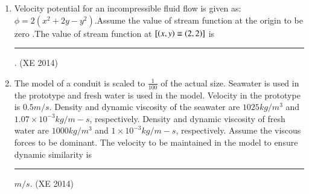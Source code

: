 \documentclass[journal,12pt,onecolumn]{IEEEtran}
\theoremstyle{remark}
\begin{document}
\begin{enumerate}
\hfill{(XE 2014)}
\begin{multicols}{4}
\begin{enumerate}

\item $\frac{k_1 + k_2}{r}$
\item $\frac{\sqrt{{k_1}^2 + {k_2}^2}}{r}$
\item a constant
\item proportional to $r^{-3}$ .

\end{enumerate}
\end{multicols}

\item Velocity potential for an incompressible fluid flow is given as: $ \phi = 2(x^2 + 2y - y^2)$.Assume the 
value of stream function at the origin to be zero .The value of stream function at $[\left(x,y\right) \equiv \left(2,2\right)]$ is \rule{2cm}{0.4pt} .
\hfill{(XE 2014)}

\item The model of a conduit is scaled to $\frac{1}{100}$ of the actual size. Seawater is used in the prototype and fresh water is used in the model. Velocity in the prototype is $0.5 m/s$. Density and dynamic viscosity of the seawater are $1025 kg/m^3$ and $1.07 \times 10^{-3} kg/m-s$, respectively. Density and dynamic viscosity of fresh water are $1000 kg/m^{3}$ and $1 \times 10^{-3} kg/m-s$, respectively. Assume the viscous forces to be dominant. The velocity to be maintained in the model to ensure dynamic similarity is \rule{2cm}{0.4pt} $m/s$. 
\hfill{(XE 2014)}
\end{enumerate}
\end{document}
